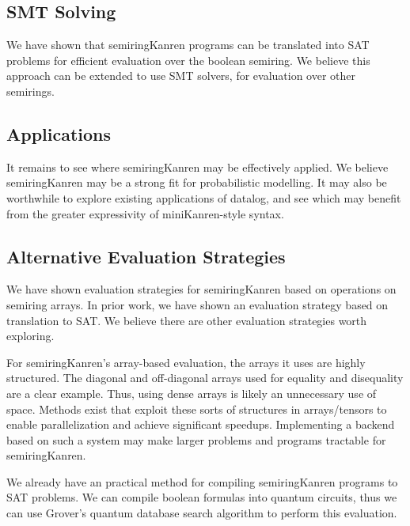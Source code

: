 \documentclass{report}
\theoremstyle{definition}
\begin{document}
\subsection{SMT Solving}

We have shown that semiringKanren programs can be translated into SAT problems for efficient evaluation over the boolean semiring\cite{volkov2025}.
We believe this approach can be extended to use SMT solvers, for evaluation over other semirings.

\subsection{Applications}

It remains to see where semiringKanren may be effectively applied.
We believe semiringKanren may be a strong fit for probabilistic modelling.
It may also be worthwhile to explore existing applications of datalog, and see which may benefit from the greater expressivity of miniKanren-style syntax.

\subsection{Alternative Evaluation Strategies}

We have shown evaluation strategies for semiringKanren based on operations on semiring arrays.
In prior work, we have shown an evaluation strategy based on translation to SAT\cite{volkov2025}.
We believe there are other evaluation strategies worth exploring.

For semiringKanren's array-based evaluation, the arrays it uses are highly structured.
The diagonal and off-diagonal arrays used for equality and disequality are a clear example.
Thus, using dense arrays is likely an unnecessary use of space.
Methods exist that exploit these sorts of structures in arrays/tensors to enable parallelization and achieve significant speedups\cite{ghorbani2025}.
Implementing a backend based on such a system may make larger problems and programs tractable for semiringKanren.

We already have an practical method for compiling semiringKanren programs to SAT problems.
We can compile boolean formulas into quantum circuits, thus we can use Grover's quantum database search algorithm\cite{grover1996} to perform this evaluation.

\printbibliography[heading=bibintoc]
\end{document}
